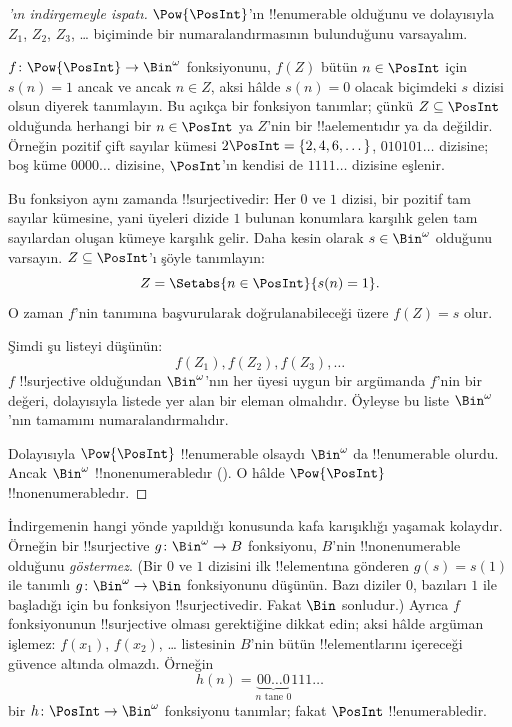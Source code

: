 \documentclass[../../../include/open-logic-section]{subfiles}
\begin{document}
\begin{proof}[{}'ın indirgemeyle ispatı]
$\Pow{\PosInt}$'ın !!{enumerable} olduğunu ve dolayısıyla $Z_1$, $Z_2$,
$Z_3$, \dots{} biçiminde bir numaralandırmasının bulunduğunu varsayalım.

$f\colon\Pow{\PosInt}\to\Bin^\omega$ fonksiyonunu, $f(Z)$ bütün
$n\in\PosInt$ için $s(n)=1$ ancak ve ancak $n\in Z$, aksi hâlde $s(n)=0$
olacak biçimdeki $s$ dizisi olsun diyerek tanımlayın. Bu açıkça bir fonksiyon
tanımlar; çünkü $Z\subseteq\PosInt$ olduğunda herhangi bir $n\in\PosInt$ ya
$Z$'nin bir !!a{element}ıdır ya da değildir. Örneğin pozitif çift sayılar
kümesi $2\PosInt=\{2,4,6,\dots\}$, $010101\dots$ dizisine; boş küme
$0000\dots$ dizisine, $\PosInt$'ın kendisi de $1111\dots$ dizisine eşlenir.

Bu fonksiyon aynı zamanda !!{surjective}dir: Her $0$ ve $1$ dizisi, bir
pozitif tam sayılar kümesine, yani üyeleri dizide $1$ bulunan konumlara
karşılık gelen tam sayılardan oluşan kümeye karşılık gelir. Daha kesin olarak
$s\in\Bin^\omega$ olduğunu varsayın. $Z\subseteq\PosInt$'ı şöyle tanımlayın:
\[
Z = \Setabs{n \in \PosInt}{s(n) = 1}.
\]
O zaman $f$'nin tanımına başvurularak doğrulanabileceği üzere $f(Z)=s$ olur.

Şimdi şu listeyi düşünün:
\[
f(Z_1), f(Z_2), f(Z_3), \dots
\]
$f$ !!{surjective} olduğundan $\Bin^\omega$'nın her üyesi uygun bir argümanda
$f$'nin bir değeri, dolayısıyla listede yer alan bir eleman olmalıdır.
Öyleyse bu liste $\Bin^\omega$'nın tamamını numaralandırmalıdır.

Dolayısıyla $\Pow{\PosInt}$ !!{enumerable} olsaydı $\Bin^\omega$ da
!!{enumerable} olurdu. Ancak $\Bin^\omega$ !!{nonenumerable}dır
(). O hâlde $\Pow{\PosInt}$
!!{nonenumerable}dır.
\end{proof}

\begin{explain}
İndirgemenin hangi yönde yapıldığı konusunda kafa karışıklığı yaşamak
kolaydır. Örneğin bir !!{surjective} $g\colon\Bin^\omega\to B$ fonksiyonu,
$B$'nin !!{nonenumerable} olduğunu \emph{göstermez}. (Bir $0$ ve $1$ dizisini
ilk !!{element}ına gönderen $g(s)=s(1)$ ile tanımlı $g\colon\Bin^\omega\to
\Bin$ fonksiyonunu düşünün. Bazı diziler $0$, bazıları $1$ ile başladığı için
bu fonksiyon !!{surjective}dir. Fakat $\Bin$ sonludur.) Ayrıca $f$
fonksiyonunun !!{surjective} olması gerektiğine dikkat edin; aksi hâlde
argüman işlemez: $f(x_1)$, $f(x_2)$, \dots{} listesinin $B$'nin bütün
!!{element}larını içereceği güvence altında olmazdı. Örneğin
\[
h(n) = \underbrace{00\dots0}_{\text{$n$ tane $0$}}111\dots
\]
bir $h\colon\PosInt\to\Bin^\omega$ fonksiyonu tanımlar; fakat $\PosInt$
!!{enumerable}dir.
\end{explain}
\end{document}
